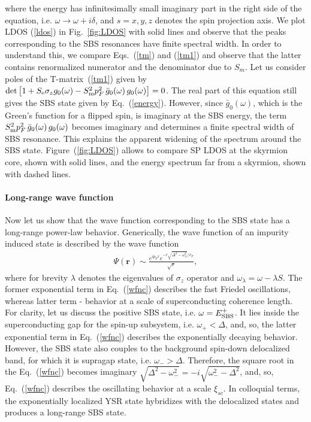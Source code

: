 \documentclass[twocolumn,showpacs,floatfix,longbibliography]{revtex4-1}
\begin{document}
 where the energy has infinitesimally small imaginary part in the right side of the equation, i.e. $\omega\rightarrow \omega+i\delta$, and $s=x,y,z$ denotes the spin projection axis. We plot LDOS (\ref{ldos}) in Fig.~\ref{fig:LDOS} with solid lines and observe that the peaks corresponding to the SBS resonances have finite spectral width. In order to understand this, we compare Eqs.~(\ref{tm}) and (\ref{tm1}) and observe that the latter contains renormalized numerator and the denominator due to $S_m$. Let us consider poles of the T-matrix~(\ref{tm1}) given by ${\rm det}\left[1+S_{\rm e}\sigma_zg_{0}(\omega)-S^2_{\rm m}p_F^2\,\bar g_{0}(\omega)\, g_{0}(\omega)\right]=0$. The real part of this equation still gives the SBS state given by Eq.~(\ref{energy}). However, since $\bar g_0(\omega)$, which is the Green's function for a flipped spin, is imaginary at the SBS energy, the term $S^2_{\rm m}p_F^2\,\bar g_{0}(\omega)\, g_{0}(\omega)$ becomes imaginary and determines a finite spectral width of SBS resonance. This explains the apparent widening of the spectrum around the SBS state.  Figure~(\ref{fig:LDOS}) allows to compare SP LDOS at the skyrmion core, shown with solid lines, and the energy spectrum far from a skyrmion, shown with dashed lines.   

\paragraph*{Long-range wave function} \label{sec:wavefuncion} 

Now let us show that the wave function corresponding to the SBS state has a long-range power-law behavior. Generically, the wave function of an impurity induced state is described by the wave function 
\begin{align}
	\Psi(\bm r) \sim \frac{e^{ip_Fr}e^{-r\sqrt{\Delta^2-\omega^2_\lambda}/v_F}}{\sqrt{r}},
	\label{wfnc}
\end{align}
where for brevity $\lambda$ denotes the eigenvalues of $\sigma_z$ operator and $\omega_\lambda = \omega - \lambda S$. The former exponential term in Eq.~(\ref{wfnc}) describes the fast Friedel oscillations, whereas latter term - behavior at a scale of superconducting coherence length. For clarity, let us discuss the positive SBS state, i.e. $\omega = E^{+}_{\rm SBS}$. It lies inside the superconducting gap for the spin-up subsystem, i.e. $\omega_+<\Delta$, and, so, the latter exponential term in Eq.~(\ref{wfnc}) describes the exponentially decaying behavior. However, the SBS state also couples to the background spin-down delocalized band, for which it is supragap state, i.e. $\omega_->\Delta$. Therefore, the square root in the Eq.~(\ref{wfnc}) becomes imaginary $\sqrt{\Delta^2-\omega^2_-}=-i\sqrt{\omega^2_- - \Delta^2}$, and, so, Eq.~(\ref{wfnc}) describes the oscillating behavior at a scale $\xi_{sc}$. In colloquial terms, the exponentially localized YSR state hybridizes with the delocalized states and produces a long-range SBS state.
\end{document}
